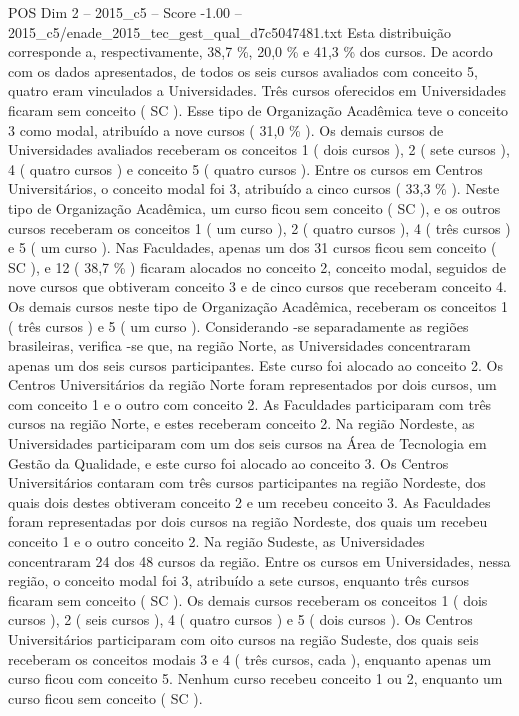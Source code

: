 \begin{textsample}{POS Dim 2 – 2015\_c5 – Score -1.00 – 2015\_c5/enade\_2015\_tec\_gest\_qual\_d7c5047481.txt}
Esta distribuição corresponde a, respectivamente, 38,7 \%, 20,0 \% e 41,3 \% dos cursos.
De acordo com os dados apresentados, de todos os seis cursos avaliados com conceito 5, quatro eram vinculados a Universidades.
Três cursos oferecidos em Universidades ficaram sem conceito ( SC ).
Esse tipo de Organização Acadêmica teve o conceito 3 como modal, atribuído a nove cursos ( 31,0 \% ).
Os demais cursos de Universidades avaliados receberam os conceitos 1 ( dois cursos ), 2 ( sete cursos ), 4 ( quatro cursos ) e conceito 5 ( quatro cursos ).
Entre os cursos em Centros Universitários, o conceito modal foi 3, atribuído a cinco cursos ( 33,3 \% ).
Neste tipo de Organização Acadêmica, um curso ficou sem conceito ( SC ), e os outros cursos receberam os conceitos 1 ( um curso ), 2 ( quatro cursos ), 4 ( três cursos ) e 5 ( um curso ).
Nas Faculdades, apenas um dos 31 cursos ficou sem conceito ( SC ), e 12 ( 38,7 \% ) ficaram alocados no conceito 2, conceito modal, seguidos de nove cursos que obtiveram conceito 3 e de cinco cursos que receberam conceito 4.
Os demais cursos neste tipo de Organização Acadêmica, receberam os conceitos 1 ( três cursos ) e 5 ( um curso ).
Considerando -se separadamente as regiões brasileiras, verifica -se que, na região Norte, as Universidades concentraram apenas um dos seis cursos participantes.
Este curso foi alocado ao conceito 2.
Os Centros Universitários da região Norte foram representados por dois cursos, um com conceito 1 e o outro com conceito 2.
As Faculdades participaram com três cursos na região Norte, e estes receberam conceito 2.
Na região Nordeste, as Universidades participaram com um dos seis cursos na Área de Tecnologia em Gestão da Qualidade, e este curso foi alocado ao conceito 3.
Os Centros Universitários contaram com três cursos participantes na região Nordeste, dos quais dois destes obtiveram conceito 2 e um recebeu conceito 3.
As Faculdades foram representadas por dois cursos na região Nordeste, dos quais um recebeu conceito 1 e o outro conceito 2.
Na região Sudeste, as Universidades concentraram 24 dos 48 cursos da região.
Entre os cursos em Universidades, nessa região, o conceito modal foi 3, atribuído a sete cursos, enquanto três cursos ficaram sem conceito ( SC ).
Os demais cursos receberam os conceitos 1 ( dois cursos ), 2 ( seis cursos ), 4 ( quatro cursos ) e 5 ( dois cursos ).
Os Centros Universitários participaram com oito cursos na região Sudeste, dos quais seis receberam os conceitos modais 3 e 4 ( três cursos, cada ), enquanto apenas um curso ficou com conceito 5.
Nenhum curso recebeu conceito 1 ou 2, enquanto um curso ficou sem conceito ( SC ).

\end{textsample}
